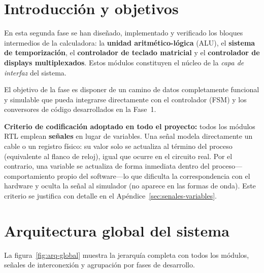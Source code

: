 \documentclass[memoria_final]{subfiles}
\begin{document}
\section{Introducción y objetivos}

En esta segunda fase se han diseñado, implementado y verificado los bloques
intermedios de la calculadora: la \textbf{unidad aritmético-lógica} (ALU),
el \textbf{sistema de temporización}, el \textbf{controlador de teclado
matricial} y el \textbf{controlador de displays multiplexados}. Estos módulos
constituyen el núcleo de la \textit{capa de interfaz} del sistema.

El objetivo de la fase es disponer de un camino de datos completamente funcional
y simulable que pueda integrarse directamente con el controlador (FSM) y los
conversores de código desarrollados en la Fase~1.

\vspace{0.5em}
\begin{tcolorbox}[colback=SoftBlue,colframe=MainBlue,boxrule=0.8pt,arc=2pt,
  left=0.5cm,right=0.5cm,top=0.3cm,bottom=0.3cm]
  \small\faInfoCircle\enspace\textbf{Criterio de codificación adoptado en todo
  el proyecto:}
  todos los módulos RTL emplean \textbf{señales} en lugar de variables.
  Una señal modela directamente un cable o un registro físico: su valor solo se
  actualiza al término del proceso (equivalente al flanco de reloj), igual que
  ocurre en el circuito real. Por el contrario, una variable se actualiza de
  forma inmediata dentro del proceso---comportamiento propio del software---lo
  que dificulta la correspondencia con el hardware y oculta la señal al
  simulador (no aparece en las formas de onda). Este criterio se justifica con
  detalle en el Apéndice~\ref{sec:senales-variables}.
\end{tcolorbox}

\section{Arquitectura global del sistema}

La figura~\ref{fig:arq-global} muestra la jerarquía completa con todos los
módulos, señales de interconexión y agrupación por fases de desarrollo.
\end{document}
